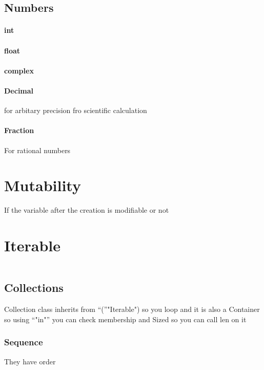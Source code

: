     \subsection{Numbers}
        
        \paragraph{int}
        
        \paragraph{float}
        
        \paragraph{complex}
        
        \paragraph{Decimal}
            for arbitary precision fro scientific calculation
        
        \paragraph{Fraction}
            For rational numbers

\section{Mutability}
    If the variable after the creation is modifiable or not

\section{Iterable}
    \begin{verbatim}
    \end{verbatim}
    \subsection{Collections}
        Collection class inherits from \enquote("Iterable") so you loop  and it is also a Container so using \enquote{"in"} you can check membership and Sized so you can call len on it
        \subsubsection{Sequence}
            They have order
        
